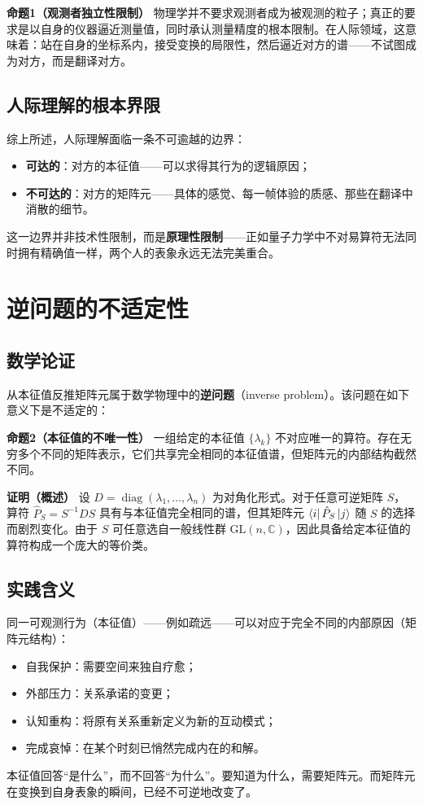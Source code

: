 ﻿\documentclass[12pt,a4paper]{ctexart}
\begin{document}
\textbf{命题1（观测者独立性限制）} 物理学并不要求观测者成为被观测的粒子；真正的要求是以自身的仪器逼近测量值，同时承认测量精度的根本限制。在人际领域，这意味着：站在自身的坐标系内，接受变换的局限性，然后逼近对方的谱——不试图成为对方，而是翻译对方。

\subsection{人际理解的根本界限}

综上所述，人际理解面临一条不可逾越的边界：

\begin{itemize}
    \item \textbf{可达的}：对方的本征值——可以求得其行为的逻辑原因；
    \item \textbf{不可达的}：对方的矩阵元——具体的感觉、每一帧体验的质感、那些在翻译中消散的细节。
\end{itemize}

这一边界并非技术性限制，而是\textbf{原理性限制}——正如量子力学中不对易算符无法同时拥有精确值一样，两个人的表象永远无法完美重合。

\section{逆问题的不适定性}

\subsection{数学论证}

从本征值反推矩阵元属于数学物理中的\textbf{逆问题}（inverse problem）。该问题在如下意义下是不适定的：

\textbf{命题2（本征值的不唯一性）} 一组给定的本征值 $\{\lambda_k\}$ 不对应唯一的算符。存在无穷多个不同的矩阵表示，它们共享完全相同的本征值谱，但矩阵元的内部结构截然不同。

\textbf{证明（概述）} 设 $D = \operatorname{diag}(\lambda_1, \dots, \lambda_n)$ 为对角化形式。对于任意可逆矩阵 $S$，算符 $\hat{P}_S = S^{-1}DS$ 具有与本征值完全相同的谱，但其矩阵元 $\bra{i}\hat{P}_S\ket{j}$ 随 $S$ 的选择而剧烈变化。由于 $S$ 可任意选自一般线性群 $\mathrm{GL}(n, \mathbb{C})$，因此具备给定本征值的算符构成一个庞大的等价类。

\subsection{实践含义}

同一可观测行为（本征值）——例如疏远——可以对应于完全不同的内部原因（矩阵元结构）：
\begin{itemize}
    \item 自我保护：需要空间来独自疗愈；
    \item 外部压力：关系承诺的变更；
    \item 认知重构：将原有关系重新定义为新的互动模式；
    \item 完成哀悼：在某个时刻已悄然完成内在的和解。
\end{itemize}
本征值回答``是什么''，而不回答``为什么''。要知道为什么，需要矩阵元。而矩阵元在变换到自身表象的瞬间，已经不可逆地改变了。
\end{document}
